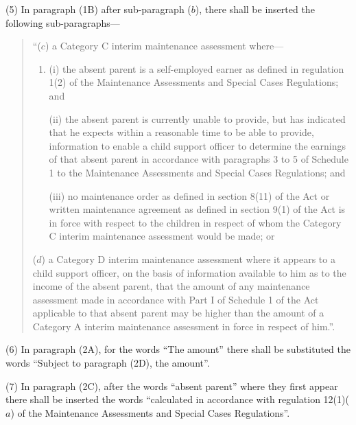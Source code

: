 \documentclass[12pt,a4paper]{article}
\begin{document}
(5) In paragraph (1B) after sub-paragraph ($b$), there shall be inserted the following sub-paragraphs—
\begin{quotation}
“($c$) a Category C interim maintenance assessment where—
\begin{enumerate}\item[]
(i) the absent parent is a self-employed earner as defined in regulation 1(2) of the Maintenance Assessments and Special Cases Regulations; and

(ii) the absent parent is currently unable to provide, but has indicated that he expects within a reasonable time to be able to provide, information to enable a child support officer to determine the earnings of that absent parent in accordance with paragraphs 3 to 5 of Schedule 1 to the Maintenance Assessments and Special Cases Regulations; and

(iii) no maintenance order as defined in section 8(11) of the Act or written maintenance agreement as defined in section 9(1) of the Act is in force with respect to the children in respect of whom the Category C interim maintenance assessment would be made; or
\end{enumerate}

($d$) a Category D interim maintenance assessment where it appears to a child support officer, on the basis of information available to him as to the income of the absent parent, that the amount of any maintenance assessment made in accordance with Part I of Schedule 1 of the Act applicable to that absent parent may be higher than the amount of a Category A interim maintenance assessment in force in respect of him.”.
\end{quotation}

(6) In paragraph (2A), for the words “The amount” there shall be substituted the words “Subject to paragraph (2D), the amount”.

(7) In paragraph (2C), after the words “absent parent” where they first appear there shall be inserted the words “calculated in accordance with regulation 12(1)($a$) of the Maintenance Assessments and Special Cases Regulations”.
\end{document}
